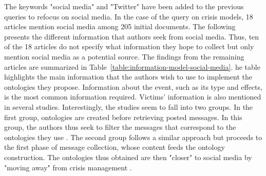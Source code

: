 The keywords "social media" and "Twitter" have been added to the previous queries to refocus on social media.
In the case of the query on crisis models, 18 articles mention social media among 205 initial documents.
The following presents the different information that authors seek from social media.
Thus, ten of the 18 articles do not specify what information they hope to collect but only mention social media as a potential source.
The findings from the remaining articles are summarized in Table~\ref{table:information-model-social-media}.
he table highlights the main information that the authors wish to use to implement the ontologies they propose.
Information about the event, such as its type and effects, is the most common information required.
Victims' information is also mentioned in several studies.
Interestingly, the studies seem to fall into two groups.
In the first group, ontologies are created before retrieving posted messages.
In this group, the authors thus seek to filter the messages that correspond to the ontologies they use \parencite{gaurEmpathiOntologyEmergency2019,moiDesignOntologyUse2016,narayanasamyCrisisDisasterSituations2019b,montarnalAutomatedEmergenceCrisis2017,cocheActionableCollaborativeCommon2019c}.
The second group follows a similar approach but proceeds to the first phase of message collection, whose content feeds the ontology construction.
The ontologies thus obtained are then "closer" to social media by "moving away" from crisis management \parencite{kemavuthanonClassificationSocialMedia2020b,kawtrakulImprovingDisasterResponsiveness2012,leeConstructionEventOntology2013}.

